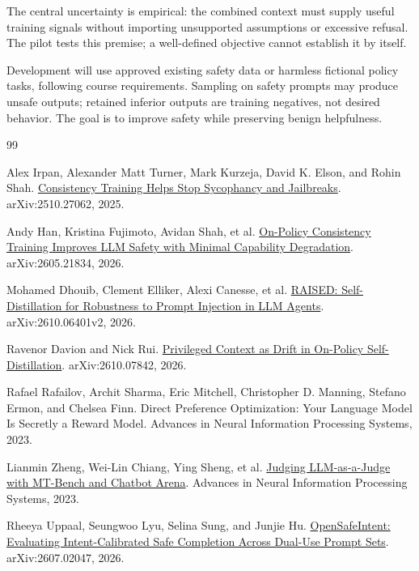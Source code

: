 \documentclass[11pt]{article}
\begin{document}
The central uncertainty is empirical: the combined context must supply useful training signals without importing unsupported assumptions or excessive refusal. The pilot tests this premise; a well-defined objective cannot establish it by itself.

Development will use approved existing safety data or harmless fictional policy tasks, following course requirements. Sampling on safety prompts may produce unsafe outputs; retained inferior outputs are training negatives, not desired behavior. The goal is to improve safety while preserving benign helpfulness.

\begin{thebibliography}{99}

Alex Irpan, Alexander Matt Turner, Mark Kurzeja, David K. Elson, and Rohin Shah.
\newblock \href{https://arxiv.org/abs/2510.27062}{Consistency Training Helps Stop Sycophancy and Jailbreaks}. arXiv:2510.27062, 2025.

Andy Han, Kristina Fujimoto, Avidan Shah, et al.
\newblock \href{https://arxiv.org/html/2605.21834v1}{On-Policy Consistency Training Improves LLM Safety with Minimal Capability Degradation}. arXiv:2605.21834, 2026.

Mohamed Dhouib, Clement Elliker, Alexi Canesse, et al.
\newblock \href{https://arxiv.org/html/2610.06401v2#A2.SS1}{RAISED: Self-Distillation for Robustness to Prompt Injection in LLM Agents}. arXiv:2610.06401v2, 2026.

Ravenor Davion and Nick Rui.
\newblock \href{https://arxiv.org/html/2610.07842v1#S2.SS4}{Privileged Context as Drift in On-Policy Self-Distillation}. arXiv:2610.07842, 2026.

Rafael Rafailov, Archit Sharma, Eric Mitchell, Christopher D. Manning, Stefano Ermon, and Chelsea Finn.
\newblock Direct Preference Optimization: Your Language Model Is Secretly a Reward Model.
\newblock Advances in Neural Information Processing Systems, 2023.

Lianmin Zheng, Wei-Lin Chiang, Ying Sheng, et al.
\newblock \href{https://arxiv.org/abs/2306.05685}{Judging LLM-as-a-Judge with MT-Bench and Chatbot Arena}.
\newblock Advances in Neural Information Processing Systems, 2023.

Rheeya Uppaal, Seungwoo Lyu, Selina Sung, and Junjie Hu.
\newblock \href{https://arxiv.org/abs/2607.02047}{OpenSafeIntent: Evaluating Intent-Calibrated Safe Completion Across Dual-Use Prompt Sets}.
\newblock arXiv:2607.02047, 2026.


\end{thebibliography}
\end{document}
